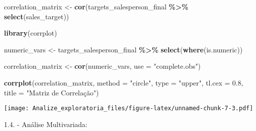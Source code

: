 \documentclass[
]{article}
\newenvironment{Shaded}{\begin{snugshade}}{\end{snugshade}}
\newcommand{\AttributeTok}[1]{\textcolor[rgb]{0.13,0.29,0.53}{#1}}
\newcommand{\FloatTok}[1]{\textcolor[rgb]{0.00,0.00,0.81}{#1}}
\newcommand{\FunctionTok}[1]{\textcolor[rgb]{0.13,0.29,0.53}{\textbf{#1}}}
\newcommand{\NormalTok}[1]{#1}
\newcommand{\OtherTok}[1]{\textcolor[rgb]{0.56,0.35,0.01}{#1}}
\newcommand{\SpecialCharTok}[1]{\textcolor[rgb]{0.81,0.36,0.00}{\textbf{#1}}}
\newcommand{\StringTok}[1]{\textcolor[rgb]{0.31,0.60,0.02}{#1}}
\begin{document}
\begin{Shaded}
\begin{Highlighting}[]
\NormalTok{correlation\_matrix }\OtherTok{\textless{}{-}} \FunctionTok{cor}\NormalTok{(targets\_salesperson\_final }\SpecialCharTok{\%\textgreater{}\%} \FunctionTok{select}\NormalTok{(sales\_target))}

\FunctionTok{library}\NormalTok{(corrplot)}


\NormalTok{numeric\_vars }\OtherTok{\textless{}{-}}\NormalTok{ targets\_salesperson\_final }\SpecialCharTok{\%\textgreater{}\%}
  \FunctionTok{select}\NormalTok{(}\FunctionTok{where}\NormalTok{(is.numeric))}

\NormalTok{correlation\_matrix }\OtherTok{\textless{}{-}} \FunctionTok{cor}\NormalTok{(numeric\_vars, }\AttributeTok{use =} \StringTok{"complete.obs"}\NormalTok{)}

\FunctionTok{corrplot}\NormalTok{(correlation\_matrix, }\AttributeTok{method =} \StringTok{"circle"}\NormalTok{, }\AttributeTok{type =} \StringTok{"upper"}\NormalTok{, }\AttributeTok{tl.cex =} \FloatTok{0.8}\NormalTok{, }\AttributeTok{title =} \StringTok{"Matriz de Correlação"}\NormalTok{)}
\end{Highlighting}
\end{Shaded}

\texttt{[image: Analize\_exploratoria\_files/figure-latex/unnamed-chunk-7-3.pdf]}

1.4. - Análise Multivariada:
\end{document}
